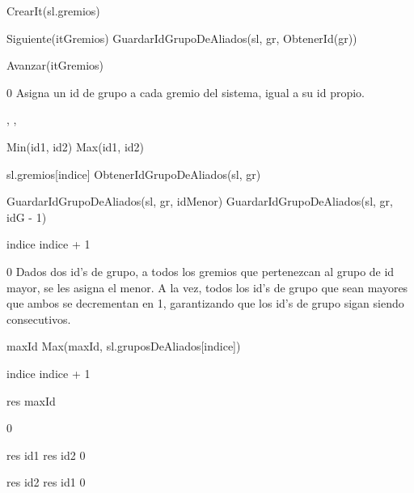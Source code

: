 {
	\state {} \asig CrearIt(sl.gremios)		
		\state
		
		\state {} \asig Siguiente(itGremios)							
		\state GuardarIdGrupoDeAliados(sl, gr, ObtenerId(gr))				

		\state
		\state Avanzar(itGremios)											
	\endwhile
}
{0}
{ Asigna un id de grupo a cada gremio del sistema, igual a su id propio. }

{, , }{}
{
	\state {} \asig Min(id1, id2)						
	\state {} \asig Max(id1, id2)						
	\state

	\state {} 										

									
		\state

		\state {} \asig sl.gremios[indice]					
		\state {} \asig ObtenerIdGrupoDeAliados(sl, gr)		
		\state

														
			\state GuardarIdGrupoDeAliados(sl, gr, idMenor)					
		\Else {}										
				\state GuardarIdGrupoDeAliados(sl, gr, idG - 1)				
			\endif
		\endif
		\state

		\state indice \asig indice + 1			
	\endwhile
}
{0}
{ Dados dos id's de grupo, a todos los gremios que pertenezcan al grupo de id mayor, se les asigna el menor. A la vez, todos los id's de grupo que sean mayores que ambos se decrementan en 1, garantizando que los id's de grupo sigan siendo consecutivos. }

{
	\state {} 									

	\state
	\state {} 								
					
		\state
		
		\state maxId \asig Max(maxId, sl.gruposDeAliados[indice])	

		\state
		\state indice \asig indice + 1								
	\endwhile
	\state

	\state res \asig maxId											
}
{0}
{}

{
						
		\state res \asig id1			
	\Else
		\state res \asig id2			
	\endif
}
{0}
{}

{
						
		\state res \asig id2			
	\Else
		\state res \asig id1			
	\endif
}
{0}
{}